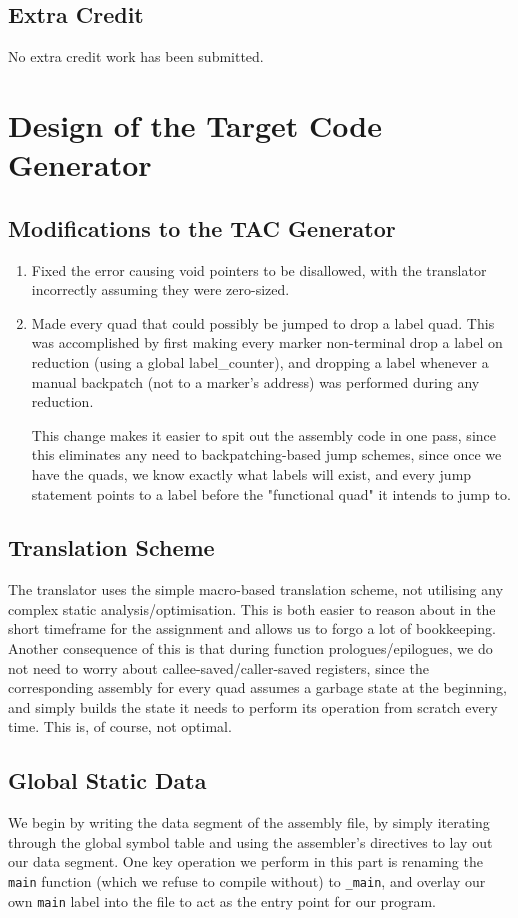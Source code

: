 \documentclass{article}
\begin{document}
\subsection{Extra Credit}{
	No extra credit work has been submitted.
}

\section{Design of the Target Code Generator}
\subsection{Modifications to the TAC Generator}{
	\begin{enumerate}
		\item Fixed the error causing void pointers to be disallowed, with the translator incorrectly assuming they were zero-sized.
		\item Made every quad that could possibly be jumped to drop a label quad. This was accomplished by first making every marker non-terminal drop a label on reduction (using a global label\_counter), and dropping a label whenever a manual backpatch (not to a marker's address) was performed during any reduction.\bigskip
		
		This change makes it easier to spit out the assembly code in one pass, since this eliminates any need to backpatching-based jump schemes, since once we have the quads, we know exactly what labels will exist, and every jump statement points to a label before the "functional quad" it intends to jump to.
	\end{enumerate}	
}

\subsection{Translation Scheme}{
	The translator uses the simple macro-based translation scheme, not utilising any complex static analysis/optimisation. This is both easier to reason about in the short timeframe for the assignment and allows us to forgo a lot of bookkeeping. Another consequence of this is that during function prologues/epilogues, we do not need to worry about callee-saved/caller-saved registers, since the corresponding assembly for every quad assumes a garbage state at the beginning, and simply builds the state it needs to perform its operation from scratch every time. This is, of course, not optimal.
}

\subsection{Global Static Data}{
	We begin by writing the data segment of the assembly file, by simply iterating through the global symbol table and using the assembler's directives to lay out our data segment. One key operation we perform in this part is renaming the \verb|main| function (which we refuse to compile without) to \verb|_main|, and overlay our own \verb|main| label into the file to act as the entry point for our program.
}
\end{document}
